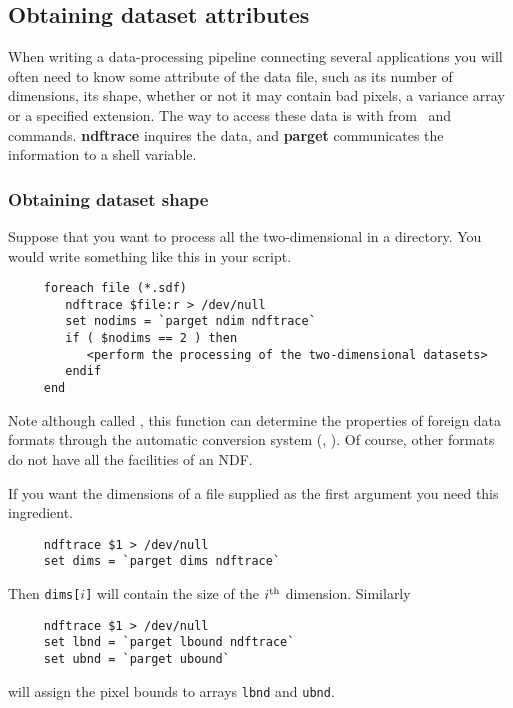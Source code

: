 \newpage
\subsection{Obtaining dataset
attributes\label{sc4_se_dataset_attributes}}

When writing a data-processing pipeline connecting several applications
you will often need to know some attribute of the data file, such as
its number of dimensions, its shape, whether or not it may contain bad
pixels, a variance array or a specified extension.  The way to 
access these data is with  from
\KAPPAref\ and  commands.
{\bf ndftrace} inquires the data, and {\bf parget} communicates the
information to a shell variable.

\subsubsection{Obtaining dataset shape
\label{sc4_se_dataset_shape}}

Suppose that you want to process all the two-dimensional  in a directory.  You would write something like this in your
script.

\small
\begin{verbatim}
     foreach file (*.sdf)
        ndftrace $file:r > /dev/null
        set nodims = `parget ndim ndftrace`
        if ( $nodims == 2 ) then
           <perform the processing of the two-dimensional datasets>
        endif
     end
\end{verbatim}
\normalsize

Note although called , this
function can determine the properties of foreign data formats through
the automatic conversion system (, 
).  Of course, other formats do not have all the
facilities of an NDF.

If you want the dimensions of a  file
supplied as the first argument you need this ingredient.

\small
\begin{verbatim}
     ndftrace $1 > /dev/null
     set dims = `parget dims ndftrace`
\end{verbatim}
\normalsize
Then {\tt dims[$i$]} will contain the size of the $i^{\rm th}$
dimension.  Similarly

\small
\begin{verbatim}
     ndftrace $1 > /dev/null
     set lbnd = `parget lbound ndftrace`
     set ubnd = `parget ubound`
\end{verbatim}
\normalsize
will assign the pixel bounds to arrays {\tt lbnd} and {\tt ubnd}.

